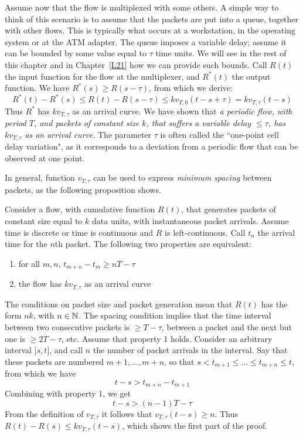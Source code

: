 Assume now that the flow is multiplexed with some others. A simple
way to think of this scenario is to assume that the packets are
put into a queue, together with other flows. This is typically
what occurs at a workstation, in the operating system or at the
ATM adapter. The queue imposes a variable delay; assume it can be
bounded by some value equal to $\tau$ time units. We will see in
the rest of this chapter and in Chapter~\ref{L21} how we can
provide such bounds. Call $R(t)$ the input function for the flow
at the multiplexer, and $R^*(t)$ the output function. We have
$R^*(s) \geq R(s - \tau)$, from which we derive:
$$
R^*(t) - R^*(s) \leq R(t) - R(s - \tau) \leq k v_{T,0}(t-s+\tau) =
k v_{T,\tau}(t-s)
$$
Thus $R^*$ has $k v_{T,\tau}$ as an arrival curve. We have shown
that \emph{a periodic flow, with period $T$, and packets of
constant size $k$, that suffers a variable delay $\leq \tau$, has
$k v_{T, \tau}$ as an arrival curve}. The parameter $\tau$ is
often called the ``one-point cell delay variation", as it
corresponds to a
deviation from a periodic flow that can be observed at one point.%
%
%
%
%
%
%

In general, function $v_{T, \tau}$ can be used to express
\emph{minimum spacing} between packets, as the following
proposition shows.

\begin{proposition}
 Consider a flow, with cumulative function
$R(t)$, that generates packets of constant size equal to $k$ data
units, with instantaneous packet arrivals. Assume time is discrete
or time is continuous and $R$ is left-continuous. Call $t_{n}$ the
arrival time for the $n$th packet. The following two properties
are equivalent:
\begin{enumerate}
    \item  for all $m,n$, $t_{m+n}-t_{m} \geq nT - \tau$
    \item  the flow has $k v_{T, \tau}$ as an arrival curve
\end{enumerate}
\end{proposition}
The conditions on packet size and packet generation mean that $R(t)$
has the form $nk$, with $n \in \mathbb{N}$.  The spacing condition implies
that the time interval between two consecutive packets is $\geq T-
\tau$, between a packet and the next but one is $\geq 2T- \tau$, etc.
\pr Assume that property 1 holds.
Consider an arbitrary interval $]s, t]$, and call $n$ the number
of packet arrivals in the interval. Say that these packets are
numbered $m+1, \ldots, m+n$, so that $s < t_{m+1}\leq \ldots \leq
t_{m+n} \leq t$, from which we have
$$
t-s > t_{m+n}- t_{m+1}
$$
Combining with  property 1,  we get
$$
t-s > (n-1) T - \tau
$$
From the definition of $v_{T, \tau}$ it follows that $v_{T,
\tau}(t-s) \geq n$. Thus $R(t)-R(s) \leq k v_{T, \tau}(t-s)$,
which shows the first part of the proof.

